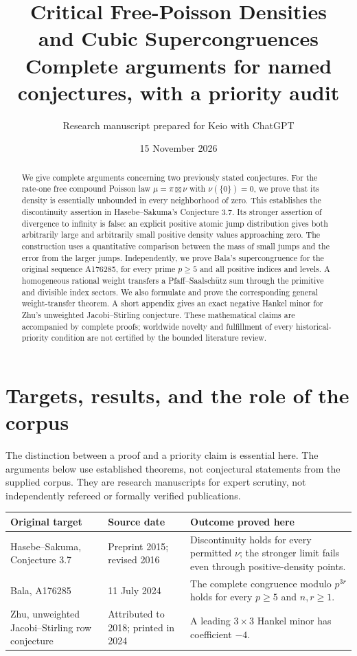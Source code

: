 \documentclass[11pt,a4paper]{article}
\title{Critical Free-Poisson Densities\\and Cubic Supercongruences\\[4pt]
\large Complete arguments for named conjectures, with a priority audit}
\author{Research manuscript prepared for Keio with ChatGPT}
\date{15 November 2026}
\numberwithin{equation}{section}
\begin{document}
\maketitle
\begin{abstract}
We give complete arguments concerning two previously stated conjectures.
For the rate-one free compound Poisson law $\mu=\pi\boxtimes\nu$ with
$\nu(\{0\})=0$, we prove that its density is essentially unbounded in
every neighborhood of zero. This establishes the discontinuity assertion
in Hasebe--Sakuma's Conjecture 3.7. Its stronger assertion of divergence
to infinity is false: an explicit positive atomic jump distribution gives
both arbitrarily large and arbitrarily small positive density values
approaching zero. The construction uses a quantitative comparison between
the mass of small jumps and the error from the larger jumps.
Independently, we prove Bala's supercongruence for the original sequence
A176285, for every prime $p\ge5$ and all positive indices and levels.
A homogeneous rational weight transfers a Pfaff--Saalsch\"utz sum through
the primitive and divisible index sectors. We also formulate and prove
the corresponding general weight-transfer theorem. A short appendix
gives an exact negative Hankel minor for Zhu's unweighted Jacobi--Stirling
conjecture. These mathematical claims are accompanied by complete proofs;
worldwide novelty and fulfillment of every historical-priority condition
are not certified by the bounded literature review.
\end{abstract}

\section{Targets, results, and the role of the corpus}
The distinction between a proof and a priority claim is essential here.
The arguments below use established theorems, not conjectural statements
from the supplied corpus. They are research manuscripts for expert
scrutiny, not independently refereed or formally verified publications.

\begin{center}\small
\begin{tabular}{@{}p{}p{}p{}@{}}
\toprule
Original target & Source date & Outcome proved here\\
\midrule
Hasebe--Sakuma, Conjecture 3.7 & Preprint 2015; revised 2016 & Discontinuity holds for every permitted $\nu$; the stronger limit fails even through positive-density points.\\[4pt]
Bala, A176285 & 11 July 2024 & The complete congruence modulo $p^{3r}$ holds for every $p\ge5$ and $n,r\ge1$.\\[4pt]
Zhu, unweighted Jacobi--Stirling row conjecture & Attributed to 2018; printed in 2024 & A leading $3\times3$ Hankel minor has coefficient $-4$.\\
\bottomrule
\end{tabular}
\end{center}
\end{document}

